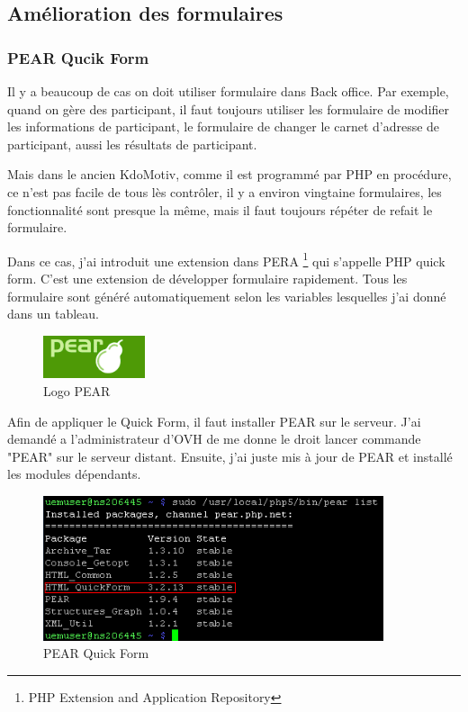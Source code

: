 \subsection{Amélioration des formulaires}

\subsubsection{PEAR Qucik Form}
Il y a beaucoup de cas on doit utiliser formulaire dans Back office.
Par exemple, quand on gère  des participant, il faut toujours utiliser les formulaire de modifier les informations de participant, le formulaire de changer le carnet d'adresse de participant, aussi les résultats de participant. 

Mais dans le ancien KdoMotiv, comme il est programmé par PHP en procédure, ce n'est pas facile de tous lès contrôler, il y a environ vingtaine formulaires, les fonctionnalité sont presque la même, mais il faut toujours répéter de refait le formulaire.

Dans ce cas, j'ai introduit une extension dans PERA \footnote{PHP Extension and Application Repository} qui s'appelle PHP quick form. C'est une extension de développer formulaire rapidement. Tous les formulaire sont généré automatiquement selon les variables lesquelles j'ai donné dans un tableau. 

\begin{figure}[hbtp]
\centering
\includegraphics[width=3cm]{body/images/pear_logo.png}
\caption{Logo PEAR}
\end{figure}


Afin de appliquer le Quick Form, il faut installer PEAR sur le serveur. J'ai demandé a l'administrateur d'OVH de me donne le droit lancer commande "PEAR" sur le serveur distant. Ensuite, j'ai juste mis à jour de PEAR et installé  les modules dépendants. 

\begin{figure}[hbtp]
\centering
\includegraphics[width=10cm]{body/images/pear_quickform.png}
\caption{PEAR Quick Form}
\end{figure}


